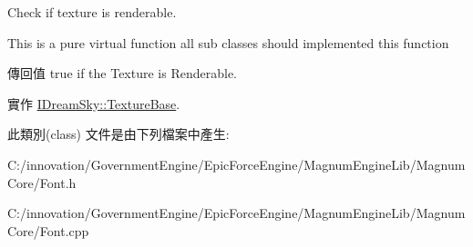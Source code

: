 Check if texture is renderable. 

This is a pure virtual function all sub classes should implemented this function \begin{DoxyReturn}{傳回值}
true if the Texture is Renderable. 
\end{DoxyReturn}


實作 \hyperlink{class_i_dream_sky_1_1_texture_base_a86cf7152863c1e16be43cc064a257345}{I\+Dream\+Sky\+::\+Texture\+Base}.



此類別(class) 文件是由下列檔案中產生\+:\begin{DoxyCompactItemize}
\item 
C\+:/innovation/\+Government\+Engine/\+Epic\+Force\+Engine/\+Magnum\+Engine\+Lib/\+Magnum\+Core/Font.\+h\item 
C\+:/innovation/\+Government\+Engine/\+Epic\+Force\+Engine/\+Magnum\+Engine\+Lib/\+Magnum\+Core/Font.\+cpp\end{DoxyCompactItemize}

